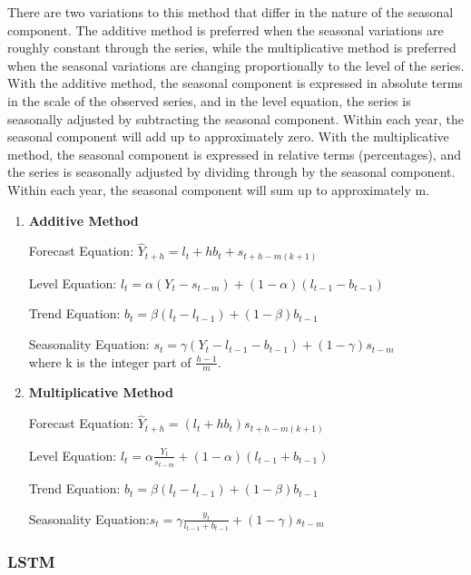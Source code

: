 \documentclass[
]{article}
\begin{document}
There are two variations to this method that differ in the nature of the
seasonal component. The additive method is preferred when the seasonal
variations are roughly constant through the series, while the
multiplicative method is preferred when the seasonal variations are
changing proportionally to the level of the series. With the additive
method, the seasonal component is expressed in absolute terms in the
scale of the observed series, and in the level equation, the series is
seasonally adjusted by subtracting the seasonal component. Within each
year, the seasonal component will add up to approximately zero. With the
multiplicative method, the seasonal component is expressed in relative
terms (percentages), and the series is seasonally adjusted by dividing
through by the seasonal component. Within each year, the seasonal
component will sum up to approximately m.

\begin{enumerate}
\def\labelenumi{\arabic{enumi}.}
\item
  \textbf{Additive Method}

  Forecast Equation:
  \(\hat{Y}_{t + h} = l_{t} + hb_{t} + s_{t + h - m(k + 1)}\)

  Level Equation:
  \(l_{t} = \alpha(Y_{t} - s_{t - m}) + (1 - \alpha)(l_{t - 1} - b_{t - 1})\)

  Trend Equation:
  \(b_{t} = \beta(l_{t} - l_{t - 1}) + (1 - \beta)b_{t - 1}\)

  Seasonality Equation:
  \(s_{t} = \gamma(Y_{t} - l_{t - 1} - b_{t - 1}) + (1 - \gamma)s_{t - m}\)\\
  where k is the integer part of \(\frac{h - 1}{m}\).
\item
  \textbf{Multiplicative Method}

  Forecast Equation:
  \(\hat{Y}_{t + h} = (l_{t} + hb_{t})s_{t + h - m(k + 1)}\)

  Level Equation:
  \(l_{t} = \alpha\frac{Y_{t}}{s_{t - m}} + (1 - \alpha)(l_{t - 1} + b_{t - 1})\)

  Trend Equation:
  \(b_{t} = \beta(l_{t} - l_{t - 1}) + (1 - \beta)b_{t - 1}\)

  Seasonality
  Equation:\(s_{t} = \gamma\frac{y_{t}}{l_{t - 1} + b_{t - 1}} + (1 - \gamma)s_{t - m}\)
\end{enumerate}

\hypertarget{lstm}{%
\subsubsection{LSTM}\label{lstm}}
\end{document}
